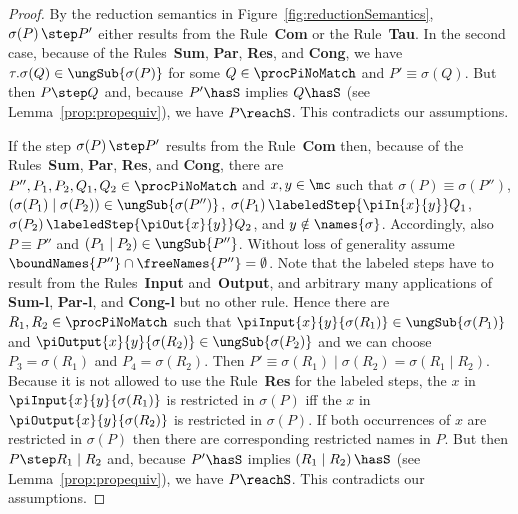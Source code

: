 \documentclass[]{article}
\begin{document}
\begin{proof}
	By the reduction semantics in Figure~\ref{fig:reductionSemantics}, $ \sigma\!\left( P \right) \step P' $ either results from the Rule~\textbf{Com} or the Rule~\textbf{Tau}. In the second case, because of the Rules~\textbf{Sum}, \textbf{Par}, \textbf{Res}, and \textbf{Cong}, we have $ \tau.\sigma\!\left( Q \right) \in \ungSub{\sigma\!\left( P \right)} $ for some $ Q \in \procPiNoMatch $ and $ P' \equiv \sigma\!\left( Q \right) $. But then $ P \step Q $ and, because $ P' \hasS $ implies $ Q \hasS $ (see Lemma~\ref{prop:propequiv}), we have $ P \reachS $. This contradicts our assumptions.
	
	If the step $ \sigma\!\left( P \right) \step P' $ results from the Rule~\textbf{Com} then, because of the Rules~\textbf{Sum}, \textbf{Par}, \textbf{Res}, and \textbf{Cong}, there are $ P'', P_1, P_2, Q_1, Q_2 \in \procPiNoMatch $ and $ x, y \in \mc $ such that $ \sigma\!\left( P \right) \equiv \sigma\!\left( P'' \right) $, $ \left( \sigma\!\left( P_1 \right) \mid \sigma\!\left( P_2 \right) \right) \in \ungSub{\sigma\!\left( P'' \right)} $, $ \sigma\!\left( P_1 \right) \labeledStep{\piIn{x}{y}} Q_1 $, $ \sigma\!\left( P_2 \right) \labeledStep{\piOut{x}{y}} Q_2 $, and $ y \notin \names{\sigma} $.
	Accordingly, also $ P \equiv P'' $ and $ \left( P_1 \mid P_2 \right) \in \ungSub{P''} $.
	Without loss of generality assume $ \boundNames{P''} \cap \freeNames{P''} = \emptyset $.
	Note that the labeled steps have to result from the Rules~\textbf{Input} and~\textbf{Output}, and arbitrary many applications of \textbf{Sum-l}, \textbf{Par-l}, and \textbf{Cong-l} but no other rule. Hence there are $ R_1, R_2 \in \procPiNoMatch $ such that $ \piInput{x}{y}{\sigma\!\left( R_1 \right)} \in \ungSub{\sigma\!\left( P_1 \right)} $ and $ \piOutput{x}{y}{\sigma\!\left( R_2 \right)} \in \ungSub{\sigma\!\left( P_2 \right)} $ and we can choose $ P_3 = \sigma\!\left( R_1 \right) $ and $ P_4 = \sigma\!\left( R_2 \right) $.
	Then $ P' \equiv \sigma\!\left( R_1 \right) \mid \sigma\!\left( R_2 \right) = \sigma\!\left( R_1 \mid R_2 \right) $. Because it is not allowed to use the Rule~\textbf{Res} for the labeled steps, the $ x $ in $ \piInput{x}{y}{\sigma\!\left( R_1 \right)} $ is restricted in $ \sigma\!\left( P \right) $ iff the $ x $ in $ \piOutput{x}{y}{\sigma\!\left( R_2 \right)} $ is restricted in $ \sigma\!\left( P \right) $. If both occurrences of $ x $ are restricted in $ \sigma\!\left( P \right) $ then there are corresponding restricted names in $ P $. But then $ P \step R_1 \mid R_2 $ and, because $ P' \hasS $ implies $ \left( R_1 \mid R_2 \right) \hasS $ (see Lemma~\ref{prop:propequiv}), we have $ P \reachS $. This contradicts our assumptions.
	

\end{proof}
\end{document}
